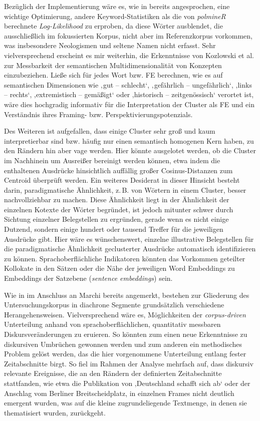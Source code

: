 Bezüglich der Implementierung wäre es, wie in  bereits angesprochen, eine wichtige Optimierung, andere Keyword-Statistiken als die von \emph{polmineR} berechnete \emph{Log-Likelihood} zu erproben, da diese Wörter ausblendet, die ausschließlich im fokussierten Korpus, nicht aber im Referenzkorpus vorkommen, was insbesondere Neologismen und seltene Namen nicht erfasst. Sehr vielversprechend erscheint es mir weiterhin, die Erkenntnisse von Kozlowski et al. \autocite*{kozlowskiGeometryCultureAnalyzing2019} zur Messbarkeit der semantischen Multidimensionalität von Konzepten einzubeziehen. Ließe sich für jedes Wort bzw. FE berechnen, wie es auf semantischen Dimensionen wie ‚gut -- schlecht`, ‚gefährlich -- ungefährlich`, ‚links -- rechts`, ‚extremistisch -- gemäßigt` oder ‚historisch -- zeitgenössisch` verortet ist, wäre dies hochgradig informativ für die Interpretation der Cluster als FE und ein Verständnis ihres Framing- bzw. Perspektivierungspotenzials.

Des Weiteren ist aufgefallen, dass einige Cluster sehr groß und kaum interpretierbar sind bzw. häufig nur einen semantisch homogenen Kern haben, zu den Rändern hin aber vage werden. Hier könnte ausgelotet werden, ob die Cluster im Nachhinein um Ausreißer bereinigt werden können, etwa indem die enthaltenen Ausdrücke hinsichtlich auffällig großer Cosinus-Distanzen zum Centroid überprüft werden. Ein weiteres Desiderat in dieser Hinsicht besteht darin, paradigmatische Ähnlichkeit, z.\,B. von Wörtern in einem Cluster, besser nachvollziehbar zu machen. Diese Ähnlichkeit liegt in der Ähnlichkeit der einzelnen Kotexte der Wörter begründet, ist jedoch mitunter schwer durch Sichtung einzelner Belegstellen zu ergründen, gerade wenn es nicht einige Dutzend, sondern einige hundert oder tausend Treffer für die jeweiligen Ausdrücke gibt. Hier wäre es wünschenswert, einzelne illustrative Belegstellen für die paradigmatische Ähnlichkeit geclusterter Ausdrücke automatisch identifizieren zu können. Sprachoberflächliche Indikatoren könnten das Vorkommen geteilter Kollokate in den Sätzen oder die Nähe der jeweiligen Word Embeddings zu Embeddings der Satzebene (\emph{sentence embeddings}) sein.

Wie in  im Anschluss an Marchi \autocite*{marchiDividingDataEpistemological2018} bereits angemerkt, bestehen zur Gliederung des Untersuchungskorpus in diachrone Segmente grundsätzlich verschiedene Herangehensweisen. Vielversprechend wäre es, Möglichkeiten der \emph{corpus-driven} Unterteilung anhand von sprachoberflächlichen, quantitativ messbaren Diskursveränderungen zu eruieren. So könnten zum einen neue Erkenntnisse zu diskursiven Umbrüchen gewonnen werden und zum anderen ein methodisches Problem gelöst werden, das die hier vorgenommene Unterteilung entlang fester Zeitabschnitte birgt. So fiel im Rahmen der Analyse mehrfach auf, dass diskursiv relevante Ereignisse, die an den Rändern der definierten Zeitabschnitte stattfanden, wie etwa die Publikation von ‚Deutschland schafft sich ab` oder der Anschlag vom Berliner Breitscheidplatz, in einzelnen Frames nicht deutlich emergent wurden, was auf die kleine zugrundeliegende Textmenge, in denen sie thematisiert wurden, zurückgeht.

